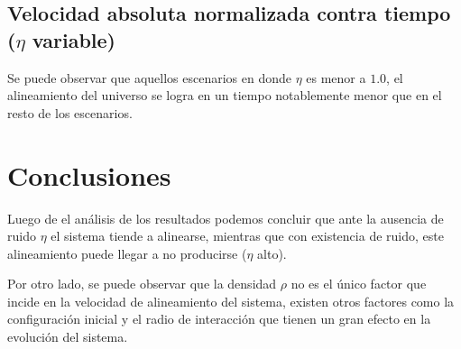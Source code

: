 \documentclass[a4paper]{article}
\begin{document}
        \subsection{Velocidad absoluta normalizada contra tiempo ($\eta$ variable)}


            Se puede observar que aquellos escenarios en donde $\eta$ es menor a $1.0$, el alineamiento del universo se logra en un tiempo notablemente menor que en el resto de los escenarios.

    \section{Conclusiones}
            Luego de el análisis de los resultados podemos concluir que ante la ausencia de ruido $\eta$ el sistema tiende a alinearse, mientras que con existencia de ruido, este alineamiento puede llegar a no producirse ($\eta$ alto).

            Por otro lado, se puede observar que la densidad $\rho$ no es el único factor que incide en la velocidad de alineamiento del sistema, existen otros factores como la configuración inicial y el radio de interacción que tienen un gran efecto en la evolución del sistema.
    \clearpage \printbibliography
\end{document}

